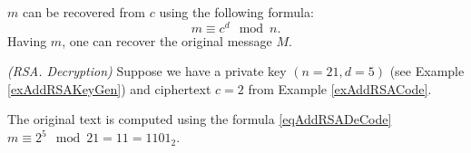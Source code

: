 $m$ can be recovered from $c$ using the following formula:
\begin{equation}
m \equiv c^d \mod{n}.
\label{eqAddRSADeCode}
\end{equation}
Having $m$, one can recover the original message $M$.
\begin{example}
\emph{(RSA. Decryption)}
Suppose we have a private key $\left(n=21, d=5\right)$ (see Example \ref{exAddRSAKeyGen}) and ciphertext $c = 2$ from Example \ref{exAddRSACode}.

The original text is computed using the formula \eqref{eqAddRSADeCode} $m \equiv 2^5 \mod{21} = 11 = 1101_2$.
\label{exAddRSADeCode}
\end{example}